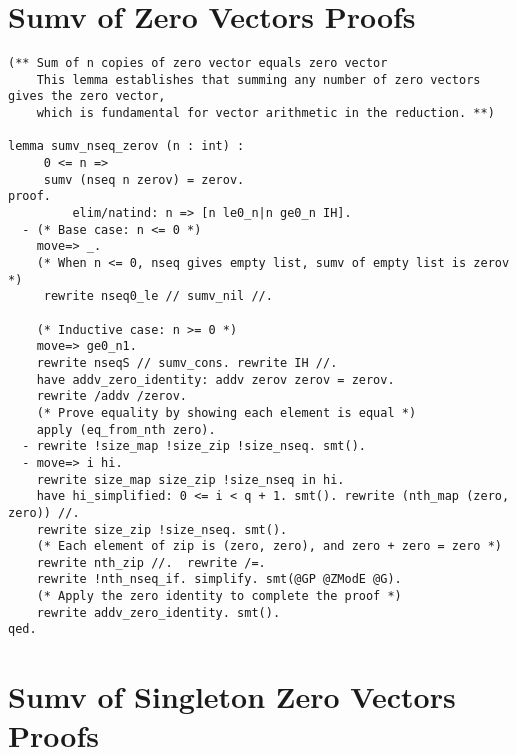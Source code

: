 \section{Sumv of Zero Vectors Proofs}
\label{sec:sumv-zerov-proofs}

\begin{lstlisting}[style=easycrypt, caption=Proof of Sumv of Zero Vectors, breaklines=true, breakatwhitespace=true, frame=single, keepspaces=true]
(** Sum of n copies of zero vector equals zero vector
    This lemma establishes that summing any number of zero vectors gives the zero vector,
    which is fundamental for vector arithmetic in the reduction. **)

lemma sumv_nseq_zerov (n : int) : 
     0 <= n =>
     sumv (nseq n zerov) = zerov.
proof.
         elim/natind: n => [n le0_n|n ge0_n IH].
  - (* Base case: n <= 0 *)
    move=> _.
    (* When n <= 0, nseq gives empty list, sumv of empty list is zerov *)
     rewrite nseq0_le // sumv_nil //.

    (* Inductive case: n >= 0 *)
    move=> ge0_n1.
    rewrite nseqS // sumv_cons. rewrite IH //.
    have addv_zero_identity: addv zerov zerov = zerov.
    rewrite /addv /zerov.
    (* Prove equality by showing each element is equal *)
    apply (eq_from_nth zero).
  - rewrite !size_map !size_zip !size_nseq. smt().
  - move=> i hi.
    rewrite size_map size_zip !size_nseq in hi.
    have hi_simplified: 0 <= i < q + 1. smt(). rewrite (nth_map (zero, zero)) //.
    rewrite size_zip !size_nseq. smt().
    (* Each element of zip is (zero, zero), and zero + zero = zero *)
    rewrite nth_zip //.  rewrite /=.
    rewrite !nth_nseq_if. simplify. smt(@GP @ZModE @G).
    (* Apply the zero identity to complete the proof *)
    rewrite addv_zero_identity. smt().
qed.
\end{lstlisting}

\section{Sumv of Singleton Zero Vectors Proofs}
\label{sec:sumv-singleton-proofs}

